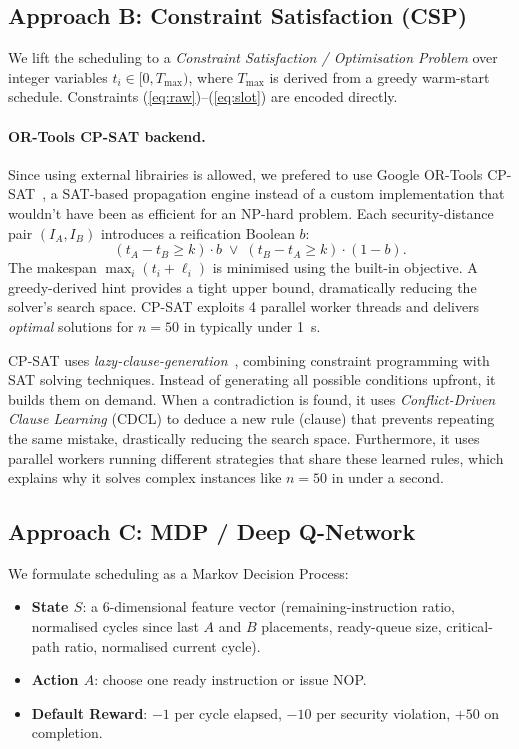 \documentclass[letterpaper]{article}
\newcommand{\approachB}{\textcolor{cspColor}{\textbf{Approach B}}}
\newcommand{\approachC}{\textcolor{dqnColor}{\textbf{Approach C}}}
\begin{document}
\subsection{\approachB: Constraint Satisfaction (CSP)}

We lift the scheduling to a \emph{Constraint Satisfaction / Optimisation
  Problem} over integer variables $t_i \in [0, T_{\max})$, where
$T_{\max}$ is derived from a greedy warm-start schedule.  Constraints
(\ref{eq:raw})--(\ref{eq:slot}) are encoded directly.

\paragraph{OR-Tools CP-SAT backend.}  Since using external librairies is allowed, we prefered to
use Google OR-Tools
CP-SAT~\cite{ortools}, a SAT-based propagation engine instead of a custom implementation
that wouldn't have been as efficient for an NP-hard problem.
Each security-distance pair $(I_A, I_B)$ introduces a reification
Boolean $b$:
\begin{equation}
  (t_A - t_B \ge k) \cdot b \;\vee\; (t_B - t_A \ge k) \cdot (1-b).
\end{equation}
The makespan $\max_i(t_i + \ell_i)$ is minimised using the built-in
objective.  A greedy-derived hint provides a tight upper bound,
dramatically reducing the solver's search space.  CP-SAT exploits 4
parallel worker threads and delivers \emph{optimal} solutions for
$n = 50$ in typically under 1~s.

\begin{underhoodbox}
  CP-SAT uses \emph{lazy-clause-generation}~\cite{ortools}, combining constraint programming with SAT solving techniques.
  Instead of generating all possible conditions upfront, it builds them on demand. When a contradiction is found, it uses \emph{Conflict-Driven Clause Learning} (CDCL) to deduce a new rule (clause) that prevents repeating the same mistake, drastically reducing the search space.
  Furthermore, it uses parallel workers running different strategies that share these learned rules, which explains why it solves complex instances like $n=50$ in under a second.
\end{underhoodbox}

\subsection{\approachC: MDP / Deep Q-Network}

We formulate scheduling as a Markov Decision Process:
\begin{itemize}\setlength\itemsep{0pt}
  \item \textbf{State $S$}: a 6-dimensional feature vector
        (remaining-instruction ratio, normalised cycles since last $A$
        and $B$ placements, ready-queue size, critical-path ratio,
        normalised current cycle).
  \item \textbf{Action $A$}: choose one ready instruction or issue NOP.
  \item \textbf{Default Reward}: $-1$ per cycle elapsed, $-10$ per security
        violation, $+50$ on completion.
\end{itemize}
\end{document}
